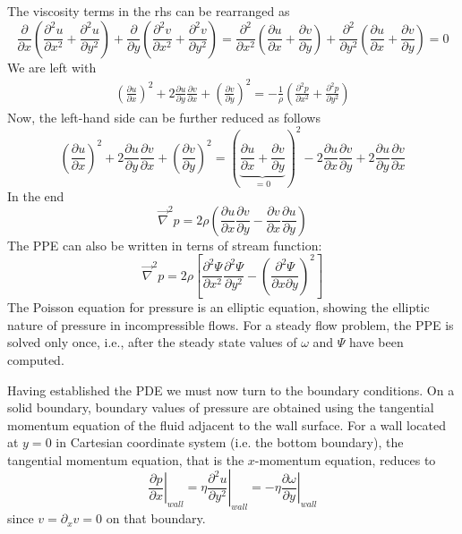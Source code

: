 The viscosity terms in the rhs can be rearranged as
\[
\frac{\partial }{\partial x} \left( \frac{\partial^2 u}{\partial x^2} + \frac{\partial^2 u}{\partial y^2} \right)
+ \frac{\partial }{\partial y}  \left( \frac{\partial^2 v}{\partial x^2} + \frac{\partial^2 v}{\partial y^2} \right)
=
\frac{\partial^2 }{\partial x^2} (\frac{\partial u}{\partial x} +\frac{\partial v}{\partial y} ) 
+
\frac{\partial^2 }{\partial y^2} (\frac{\partial u}{\partial x} +\frac{\partial v}{\partial y} )
=0
\]
We are left with
\begin{eqnarray}
(\frac{\partial u}{\partial x})^2 
+ 2\frac{\partial u}{\partial y} \frac{\partial v}{\partial x}
+ (\frac{\partial v}{\partial y} )^2
=
-\frac{1}{\rho} (\frac{\partial^2 p}{\partial x^2} + \frac{\partial^2 p}{\partial y^2})
\end{eqnarray}
Now, the left-hand side can be further reduced as follows
\[
(\frac{\partial u}{\partial x})^2 
+ 2\frac{\partial u}{\partial y} \frac{\partial v}{\partial x}
+ (\frac{\partial v}{\partial y} )^2
= ( \underbrace{\frac{\partial u}{\partial x}+ \frac{\partial v}{\partial y} }_{=0})^2
- 2 \frac{\partial u}{\partial x} \frac{\partial v}{\partial y}
+ 2\frac{\partial u}{\partial y} \frac{\partial v}{\partial x}
\]
In the end
\[
\vec\nabla^2 p = 2\rho  \left(
\frac{\partial u}{\partial x}\frac{\partial v}{\partial y}-
\frac{\partial v}{\partial x}\frac{\partial u}{\partial y}
\right)
\]
The PPE can also be written in terns of stream function:
\[
\boxed{
\vec\nabla^2 p = 2\rho  \left[
\frac{\partial^2 \Psi}{\partial x^2}\frac{\partial^2 \Psi}{\partial y^2}-
\left(\frac{\partial^2 \Psi}{\partial x \partial y}\right)^2
\right]
}
\]
The Poisson equation for pressure is an elliptic equation, showing the elliptic nature of pressure in incompressible flows. For a steady flow problem, the PPE is solved only once, i.e., after the steady state
values of $\omega$ and $\Psi$ have been computed.

Having established the PDE we must now turn to the boundary conditions. 
On a solid boundary, boundary values of pressure are obtained using the tangential momentum equation 
of the fluid adjacent to the wall surface. For a wall located at $y=0$ in Cartesian coordinate system (i.e.
the bottom boundary), the tangential momentum equation, that is  the $x$-momentum equation, reduces to
\[
\left.\frac{\partial p}{\partial x}\right\rvert_{wall} 
= \eta \left.\frac{\partial^2 u}{\partial y^2}\right\rvert_{wall}
= -\eta \left. \frac{\partial \omega}{\partial y}\right\rvert_{wall}
\]
since $v= \partial_x v =0$ on that boundary.

